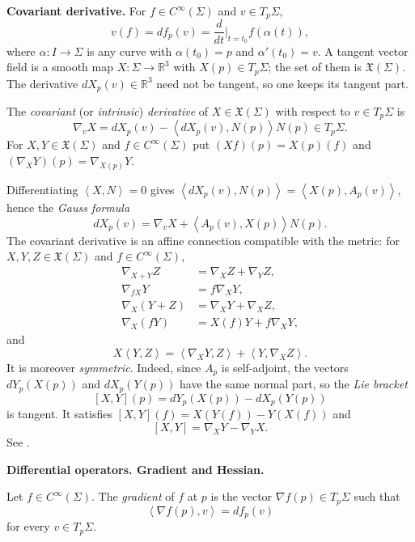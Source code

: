 \medskip\noindent
{\bf Covariant derivative.}
For $f\in C^\infty(\Sigma)$ and
$v\in T_p\Sigma$,
$$
v(f)=df_p(v)
=\frac{d}{dt}\Big|_{t=t_0}f(\alpha(t)),
$$
where $\alpha:I\to\Sigma$ is any curve
with $\alpha(t_0)=p$ and $\alpha'(t_0)=v$.
A tangent vector field is a smooth map
$X:\Sigma\to\mathbb{R}^3$ with
$X(p)\in T_p\Sigma$; the set of them is
$\mathfrak{X}(\Sigma)$. The derivative
$dX_p(v)\in\mathbb{R}^3$ need not be
tangent, so one keeps its tangent part.

\begin{definition}
\label{definition-alias-covariant-derivative}
The \emph{covariant} (or
\emph{intrinsic}) \emph{derivative} of
$X\in\mathfrak{X}(\Sigma)$ with respect to
$v\in T_p\Sigma$ is
$$
\nabla_vX=dX_p(v)
-\left\langle{} dX_p(v),N(p)
\right\rangle{}N(p)\in T_p\Sigma.
$$
For $X,Y\in\mathfrak{X}(\Sigma)$ and
$f\in C^\infty(\Sigma)$ put
$(Xf)(p)=X(p)(f)$ and
$(\nabla_XY)(p)=\nabla_{X(p)}Y$.
\end{definition}

Differentiating $\left\langle{} X,N
\right\rangle{}=0$ gives
$\left\langle{} dX_p(v),N(p)
\right\rangle{}=\left\langle{}
X(p),A_p(v)\right\rangle{}$, hence the
\emph{Gauss formula}
\begin{equation}
\label{equation-alias-gauss-formula}
dX_p(v)=\nabla_vX
+\left\langle{} A_p(v),X(p)
\right\rangle{}N(p).
\end{equation}
The covariant derivative is an affine
connection compatible with the metric:
for $X,Y,Z\in\mathfrak{X}(\Sigma)$ and
$f\in C^\infty(\Sigma)$,
$$
\begin{aligned}
\nabla_{X+Y}Z&=\nabla_XZ+\nabla_YZ,\\
\nabla_{fX}Y&=f\nabla_XY,\\
\nabla_X(Y+Z)&=\nabla_XY+\nabla_XZ,\\
\nabla_X(fY)&=X(f)Y+f\nabla_XY,
\end{aligned}
$$
and
$$
X\left\langle{} Y,Z\right\rangle{}
=\left\langle{} \nabla_XY,Z
\right\rangle{}
+\left\langle{} Y,\nabla_XZ
\right\rangle{}.
$$
It is moreover \emph{symmetric}. Indeed,
since $A_p$ is self-adjoint, the vectors
$dY_p(X(p))$ and $dX_p(Y(p))$ have the
same normal part, so the
\emph{Lie bracket}
$$
[X,Y](p)=dY_p(X(p))-dX_p(Y(p))
$$
is tangent. It satisfies
$[X,Y](f)=X(Y(f))-Y(X(f))$ and
$$
[X,Y]=\nabla_XY-\nabla_YX.
$$
See \cite[Section 1.2,
pp.~3--6]{alias2006analisis}.

\medskip\noindent
{\bf Differential operators. Gradient and
Hessian.}

\begin{definition}
\label{definition-alias-gradient}
Let $f\in C^\infty(\Sigma)$. The
\emph{gradient} of $f$ at $p$ is the
vector $\nabla f(p)\in T_p\Sigma$ such that
$$
\left\langle{} \nabla f(p),v
\right\rangle{}=df_p(v)
$$
for every $v\in T_p\Sigma$.
\end{definition}


